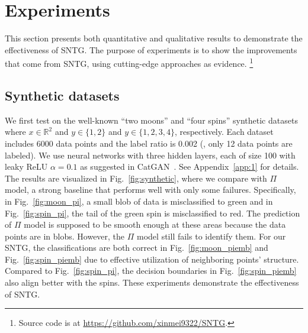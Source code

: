\documentclass[10pt,twocolumn,letterpaper]{article}
\begin{document}
\section{Experiments}
\label{sec:exp}
This section presents both quantitative and qualitative results to demonstrate the effectiveness of SNTG. The purpose of experiments is to show the improvements that come from SNTG, using cutting-edge approaches as evidence. \footnote{Source code is at \url{https://github.com/xinmei9322/SNTG}.}

\subsection{Synthetic datasets}
We first test on the well-known ``two moons'' and ``four spins'' synthetic datasets where $x\in \mathbb{R}^2$ and $y\in\{1,2\}$ and $y\in\{1,2,3,4\}$, respectively. Each dataset includes 6000 data points and the label ratio is 0.002 (\ie, only 12 data points are labeled).
We use neural networks with three hidden layers, each of size 100 with leaky ReLU $\alpha=0.1$ as suggested in CatGAN~\cite{springenberg2015unsupervised}. See Appendix~\ref{app:1} for details.
The results are visualized in Fig.~\ref{fig:synthetic}, where we compare with $\Pi$ model, a strong baseline that performs well with only some failures. Specifically, in Fig.~\ref{fig:moon_pi}, a small blob of data is misclassified to green and in Fig.~\ref{fig:spin_pi}, the tail of the green spin is misclassified to red. The prediction of $\Pi$ model is supposed to be smooth enough at these areas because the data points are in blobs. However, the $\Pi$ model still fails to identify them. For our SNTG, the classifications are both correct in Fig.~\ref{fig:moon_piemb} and Fig.~\ref{fig:spin_piemb} due to effective utilization of neighboring points' structure. Compared to Fig.~\ref{fig:spin_pi}, the decision boundaries in Fig.~\ref{fig:spin_piemb} also align better with the spins. These experiments demonstrate the effectiveness of SNTG.
\end{document}
